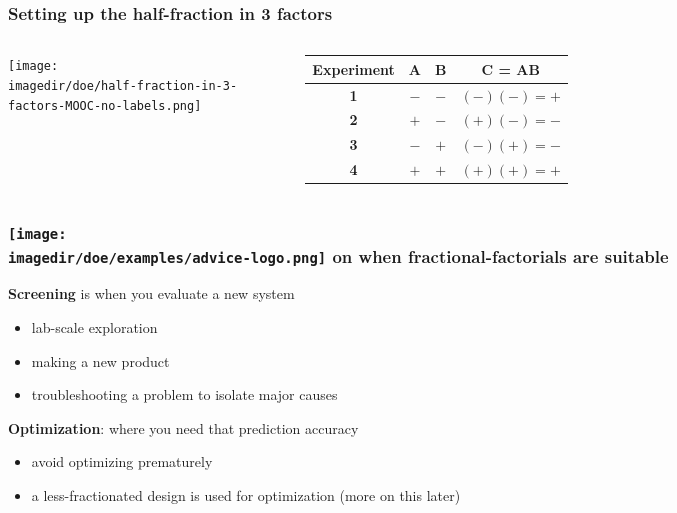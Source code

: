 \begin{frame}\frametitle{Setting up the half-fraction in 3 factors}
	\begin{columns}
			\begin{center}
				\texttt{[image: \\imagedir/doe/half-fraction-in-3-factors-MOOC-no-labels.png]}
			\end{center}
			
			\begin{tabulary}{\linewidth}{|c||c|c|c|}\hline 
				\textsf{\relax Experiment } & \textbf{\relax A } & \textbf{\relax B } & \textbf{\relax C = AB } \\
				\hline \textbf{1} & \(-\) & \(-\) & \((-)(-) = +\) \\
				\hline \textbf{2} & \(+\) & \(-\) & \((+)(-) = -\) \\
				\hline \textbf{3} & \(-\) & \(+\) & \((-)(+) = -\) \\
				\hline \textbf{4} & \(+\) & \(+\) & \((+)(+) = +\) \\
				\hline
			\end{tabulary}
			
	\end{columns}
\end{frame}

\begin{frame}\frametitle{\texttt{[image: \\imagedir/doe/examples/advice-logo.png]} on when fractional-factorials are suitable}
	\textbf{Screening} is when you evaluate a new system
	\begin{itemize}
		\item	lab-scale exploration
		\item	making a new product
		\item	troubleshooting a problem to isolate major causes
	\end{itemize}
	
	\pause
	\vspace{1cm}
	\textbf{Optimization}: where you need that prediction accuracy
	\begin{itemize}
		\item	avoid optimizing prematurely
		\item	a less-fractionated design is used for optimization (more on this later)
	\end{itemize}
	
\end{frame}

